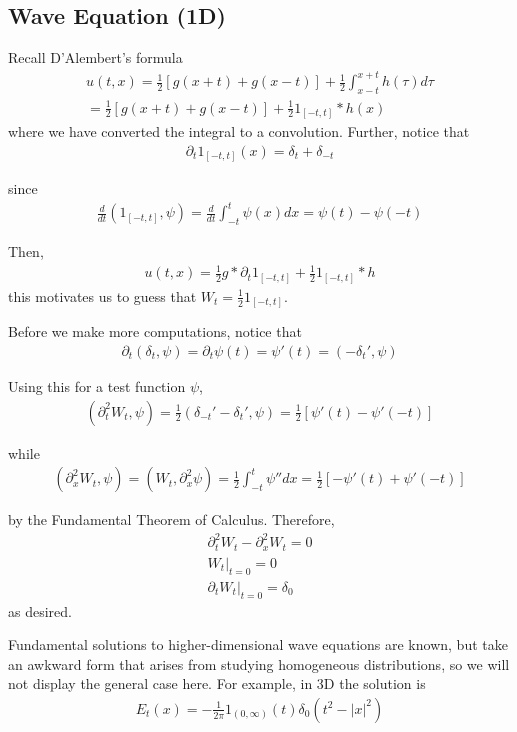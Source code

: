 \documentclass{article}
\newcommand{\pd}{\partial}
\begin{document}
	
	\subsection{Wave Equation (1D)}
	
	Recall D'Alembert's formula 
	\begin{align*}
		u(t,x) = \frac{1}{2} \left[ g(x+t) + g(x-t)\right] + \frac{1}{2} \int_{x-t}^{x+t} h(\tau) d\tau \\
		= \frac{1}{2} \left[ g(x+t) + g(x-t)\right] + \frac{1}{2} 1_{[-t,t]} * h(x)
	\end{align*}
	where we have converted the integral to a convolution. Further, notice that 
	\begin{align*}
		\pd_{t} 1_{[-t,t]}(x) = \delta_{t} + \delta_{-t}
	\end{align*}
	
	since 
	\begin{align*}
		\frac{d}{dt}(1_{[-t,t]},\psi) = \frac{d}{dt} \int_{-t}^{t} \psi(x)dx = \psi(t)-\psi(-t)
	\end{align*}
	
	Then, 
	\begin{align*}
		u(t,x) = \frac{1}{2} g * \pd_{t} 1_{[-t,t]} + \frac{1}{2} 1_{[-t,t]}*h
	\end{align*}
	this motivates us to guess that $W_{t} = \frac{1}{2} 1_{[-t,t]}$.
	
	Before we make more computations, notice that 
	\begin{align*}
		\pd_{t}(\delta_t,\psi) = \pd_{t} \psi(t) = \psi'(t) = (-\delta_{t}',\psi)
	\end{align*}
	
	Using this for a test function $\psi$,
	\begin{align*}
		(\pd_{t}^{2}W_{t},\psi) = \frac{1}{2}(\delta_{-t}' - \delta_{t}',\psi) = \frac{1}{2}[\psi'(t) - \psi'(-t)]
	\end{align*}
	
	while 
	\begin{align*}
		(\pd_{x}^{2}W_{t},\psi) = (W_{t},\pd_{x}^{2}\psi) = \frac{1}{2} \int_{-t}^{t}\psi '' dx = \frac{1}{2}[-\psi'(t) + \psi'(-t)]
	\end{align*}
	
	by the Fundamental Theorem of Calculus. Therefore, 
	\begin{align*}
		\pd_{t}^{2}W_{t} - \pd_{x}^{2} W_{t} = 0 \\
		W_{t}|_{t=0} = 0 \\
		\pd_{t} W_{t}|_{t=0} = \delta_0
	\end{align*}
	as desired.  
	
	Fundamental solutions to higher-dimensional wave equations are known, but take an awkward form that arises from studying homogeneous distributions, so we will not display the general case here. For example, in 3D the solution is 
	\begin{align*}
		E_{t}(x) = -\frac{1}{2\pi}1_{(0,\infty)}(t) \delta_{0}(t^{2}-|x|^{2})
	\end{align*}
	
	
	
	
\end{document}
